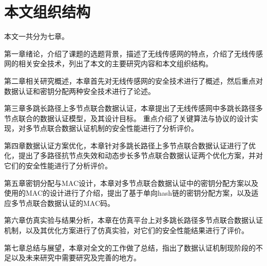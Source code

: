 \section{本文组织结构}
本文一共分为七章。

第一章\quad 绪论，介绍了课题的选题背景，描述了无线传感网的特点，介绍了无线传感网的相关安全技术，列出了本文的主要研究内容和本文组织结构。

第二章\quad 相关研究概述，本章首先对无线传感网的安全技术进行了概述，然后重点对数据认证和密钥分配两种安全技术进行了论述。

第三章\quad 多跳长路径上多节点联合数据认证，本章提出了无线传感网中多跳长路径多节点联合的数据认证模型，及其设计目标。
重点介绍了关键算法与协议的设计实现，对多节点联合数据认证机制的安全性能进行了分析评价。

第四章\quad 数据认证方案优化，本章针对多跳长路径上多节点联合数据认证进行了优化，提出了多路径抗节点失效和动态步长多节点联合数据认证两个优化方案，并对它们的安全性能进行了分析评价。

第五章\quad 密钥分配与MAC设计，本章对多节点联合数据认证中的密钥分配方案以及使用的MAC的设计进行了介绍，提出了基于单向hash链的密钥分配方案，以及适应多节点联合数据认证的MAC码。

第六章\quad 仿真实验与结果分析，本章在仿真平台上对多跳长路径多节点联合数据认证机制，以及其优化方案进行了仿真实验，对它们的安全性能结果进行了评价。

第七章\quad 总结与展望，本章对全文的工作做了总结，指出了数据认证机制现阶段的不足以及未来研究中需要研究及完善的地方。

